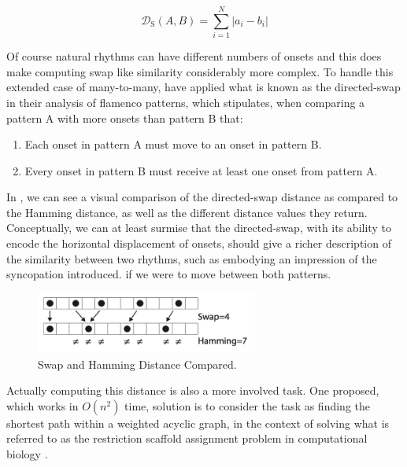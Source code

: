 \begin{equation}
\label{eq:swap}
	\mathcal{D}_\mathrm{S}(A,B) = {\sum_{i=1}^{N}|a_i-b_i|}	
\end{equation}

Of course natural rhythms can have different numbers of onsets and this does make computing swap like similarity considerably more complex. To handle this extended case of many-to-many, \cite{Diaz-Banez2004} have applied what is known as the directed-swap in their analysis of flamenco patterns, which stipulates, when comparing a pattern A with more onsets than pattern B that:

\begin{enumerate}
	\item Each onset in pattern A must move to an onset in pattern B.
	\item Every onset in pattern B must receive at least one onset from pattern A.
\end{enumerate}

In , we can see a visual comparison of the directed-swap distance as compared to the Hamming distance, as well as the different distance values they return. Conceptually, we can at least surmise that the directed-swap, with its ability to encode the horizontal displacement of onsets, should give a richer description of the similarity between two rhythms, such as embodying an impression of the syncopation introduced. if we were to move between both patterns.

\begin{figure}
	\begin{center}
		\includegraphics[width=0.65\textwidth]{ch03_symbolic/figures/swap_vs_hamming.png}
	\end{center}
	\caption[Swap and Hamming Distance Compared.]{Swap and Hamming Distance Compared.}
	\label{fig:swapvshamming}
\end{figure}

Actually computing this distance is also a more involved task. One proposed, which works in $O(n^{2})$ time, solution is to consider the task as finding the shortest path within a weighted acyclic graph, in the context of solving what is referred to as the restriction scaffold assignment problem in computational biology \citep{Colannino2005}.

